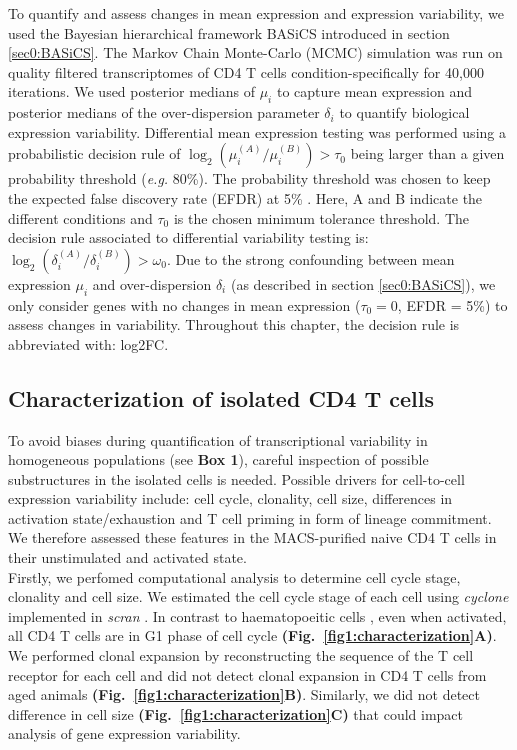 To quantify and assess changes in mean expression and expression variability, we used the Bayesian hierarchical framework BASiCS introduced in section \ref{sec0:BASiCS}\citep{Vallejos2015BASiCS, Vallejos2016}. The Markov Chain Monte-Carlo (MCMC) simulation was run on quality filtered transcriptomes of CD4\plus{} T cells condition-specifically for 40,000 iterations. We used posterior medians of $\mu_i$ to capture mean expression and posterior medians of the over-dispersion parameter $\delta_i$ to quantify biological expression variability. Differential mean expression testing was performed using a probabilistic decision rule of $\log_2(\mu_i^{(A)}/\mu_i^{(B)})>\tau_0$ being larger than a given probability threshold (\emph{e.g.} 80\%). The probability threshold was chosen to keep the expected false discovery rate (EFDR) at 5\% \citep{Vallejos2016}. Here, A and B indicate the different conditions and $\tau_0$ is the chosen minimum tolerance threshold. The decision rule associated to differential variability testing is: $\log_2(\delta_i^{(A)}/\delta_i^{(B)})>\omega_0$. Due to the strong confounding between mean expression $\mu_i$ and over-dispersion $\delta_i$ (as described in section \ref{sec0:BASiCS}), we only consider genes with no changes in mean expression ($\tau_0=0$, EFDR = 5\%) to assess changes in variability. Throughout this chapter, the decision rule is abbreviated with: log2FC. 

\newpage

\subsection{Characterization of isolated CD4\plus{} T cells}
\label{sec1:characterization}

To avoid biases during quantification of transcriptional variability in homogeneous populations (see \textbf{Box 1}), careful inspection of possible substructures in the isolated cells is needed. Possible drivers for cell-to-cell expression variability include: cell cycle, clonality, cell size, differences in activation state/exhaustion and T cell priming in form of lineage commitment. We therefore assessed these features in the MACS-purified naive CD4\plus{} T cells in their unstimulated and activated state.\\

Firstly, we perfomed computational analysis to determine cell cycle stage, clonality and cell size. We estimated the cell cycle stage of each cell using \emph{cyclone} \citep{Scialdone2015} implemented in \emph{scran} \citep{Lun2016}. In contrast to haematopoeitic cells \citep{Kowalczyk2015}, even when activated, all CD4\plus{} T cells are in G1 phase of cell cycle \textbf{(Fig.~\ref{fig1:characterization}A)}. We performed clonal expansion by reconstructing the sequence of the T cell receptor for each cell \citep{Stubbington2015} and did not detect clonal expansion in CD4\plus{} T cells from aged animals \textbf{(Fig.~\ref{fig1:characterization}B)}. Similarly, we did not detect difference in cell size \textbf{(Fig.~\ref{fig1:characterization}C)} that could impact analysis of gene expression variability. \\


